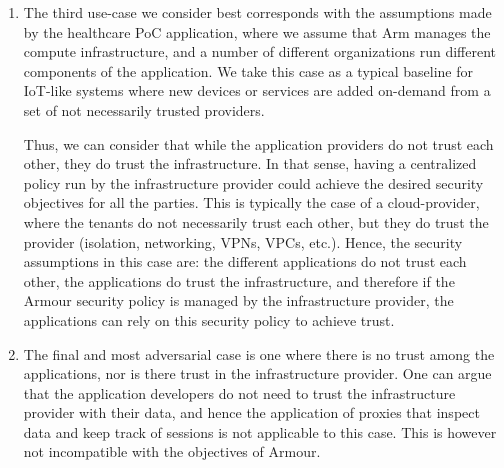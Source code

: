 \documentclass[a4paper%
]{article}
\newcommand{\armour}{{\sc Armour}}
\begin{document}
\begin{enumerate}
  Alongside with the security measures considered above, in this
  scenario the \armour{} policy would act as a safety-net ensuring
  that the composition of different (perhaps dynamic) actors does not
  violate the high-level security objective. 

  The trust model for this scenario requires that all applications
  trust the enforcer of the security policy, and the policy acts as a
  security monitor to prevent errors stemming from the composition
  with unknown code.

\item The third use-case we consider best corresponds with the
  assumptions made by the healthcare PoC application, where we assume
  that Arm manages the compute infrastructure, and a number of
  different organizations run different components of the application.
  We take this case as a typical baseline for IoT-like systems where new
  devices or services are added on-demand from a set of
  not necessarily trusted providers.

  Thus, we can consider that while the application providers do not
  trust each other, they do trust the infrastructure.
  In that sense, having a centralized policy run by the infrastructure
  provider could achieve the desired security objectives for all the
  parties.
  This is typically the case of a cloud-provider, where the tenants do
  not necessarily trust each other, but they do trust the provider
  (isolation, networking, VPNs, VPCs, etc.).
  Hence, the security assumptions in this case are: the different
  applications do not trust each other, the applications do trust the
  infrastructure, and therefore if the \armour{} security policy is
  managed by the infrastructure provider, the applications can rely on
  this security policy to achieve trust. 
  
\item The final and most adversarial case is one where there is no trust
  among the applications, nor is there trust in the infrastructure
  provider.
  One can argue that the application developers do not need
  to trust the infrastructure provider with their data, and hence the
  application of proxies that inspect data and keep track of sessions
  is not applicable to this case.
  This is however not incompatible with the objectives of \armour{}. 
  

\end{enumerate}
\end{document}
